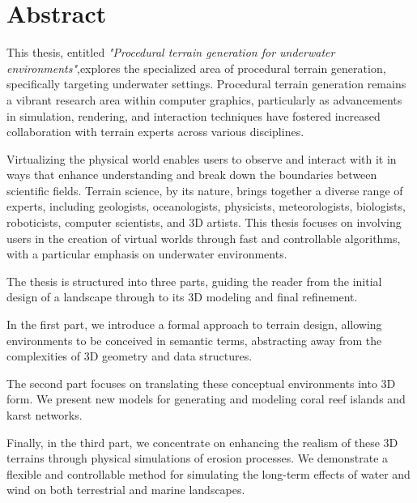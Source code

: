 \clearpage
\pagebreak

\section*{Abstract}

This thesis, entitled \textit{"Procedural terrain generation for underwater environments"},explores the specialized area of procedural terrain generation, specifically targeting underwater settings. Procedural terrain generation remains a vibrant research area within computer graphics, particularly as advancements in simulation, rendering, and interaction techniques have fostered increased collaboration with terrain experts across various disciplines.

Virtualizing the physical world enables users to observe and interact with it in ways that enhance understanding and break down the boundaries between scientific fields. Terrain science, by its nature, brings together a diverse range of experts, including geologists, oceanologists, physicists, meteorologists, biologists, roboticists, computer scientists, and 3D artists. This thesis focuses on involving users in the creation of virtual worlds through fast and controllable algorithms, with a particular emphasis on underwater environments.

The thesis is structured into three parts, guiding the reader from the initial design of a landscape through to its 3D modeling and final refinement.

In the first part, we introduce a formal approach to terrain design, allowing environments to be conceived in semantic terms, abstracting away from the complexities of 3D geometry and data structures.

The second part focuses on translating these conceptual environments into 3D form. We present new models for generating and modeling coral reef islands and karst networks.

Finally, in the third part, we concentrate on enhancing the realism of these 3D terrains through physical simulations of erosion processes. We demonstrate a flexible and controllable method for simulating the long-term effects of water and wind on both terrestrial and marine landscapes.







